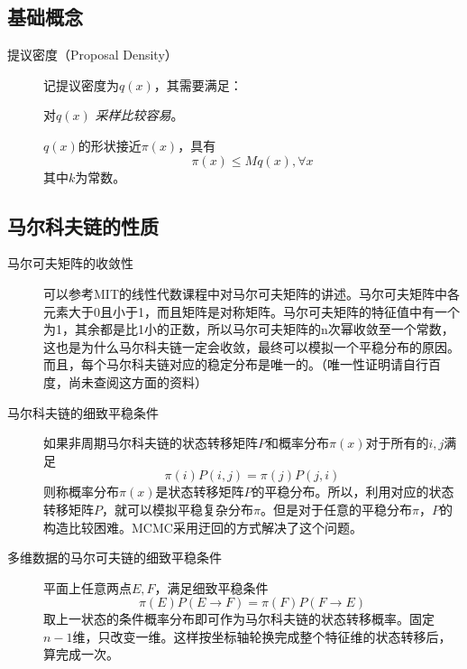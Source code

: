 \documentclass{ctexart}
\begin{document}
\subsection{基础概念}
\label{distribution}
\begin{description}
\item[提议密度（Proposal Density）]
记提议密度为$q\left(x\right)$，其需要满足：
\begin{enumerate}[-]
\begin{item}
对$q\left(x\right)$ \emph{采样比较容易}。
\end{item}
\begin{item}
 $q\left(x\right)$的形状接近$\pi \left(x\right)$，具有
 \begin{equation}
 \pi \left(x\right) \le  Mq\left(x\right),\forall x
 \end{equation}
 其中$k$为常数。
\end{item}
\end{enumerate}

\end{description}

\subsection{马尔科夫链的性质}
\label{concepts}
\begin{description}
\item[马尔可夫矩阵的收敛性]
可以参考MIT的线性代数课程中对马尔可夫矩阵的讲述。马尔可夫矩阵中各元素大于0且小于1，而且矩阵是对称矩阵。马尔可夫矩阵的特征值中有一个为1，其余都是比1小的正数，所以马尔可夫矩阵的n次幂收敛至一个常数，这也是为什么马尔科夫链一定会收敛，最终可以模拟一个平稳分布的原因。而且，每个马尔科夫链对应的稳定分布是唯一的。（唯一性证明请自行百度，尚未查阅这方面的资料）

\item[马尔科夫链的细致平稳条件]
如果非周期马尔科夫链的状态转移矩阵$P$和概率分布$\pi\left(x\right)$对于所有的$i,j$满足
\begin{equation}
\pi\left(i\right)P\left(i,j\right)=\pi\left(j\right)P\left(j,i\right)
\end{equation}
则称概率分布$\pi\left(x\right)$是状态转移矩阵$P$的平稳分布。所以，利用对应的状态转移矩阵$P$，就可以模拟平稳复杂分布$\pi$。但是对于任意的平稳分布$\pi$，$P$的构造比较困难。MCMC采用迂回的方式解决了这个问题。

\item[多维数据的马尔可夫链的细致平稳条件]

平面上任意两点$E,F$，满足细致平稳条件
\begin{equation}
\pi\left(E\right)P\left(E\to F\right)=\pi\left(F\right)P\left(F\to E\right)
\end{equation}
取上一状态的条件概率分布即可作为马尔科夫链的状态转移概率。固定$n-1$维，只改变一维。这样按坐标轴轮换完成整个特征维的状态转移后，算完成一次。

\end{description}
\end{document}
